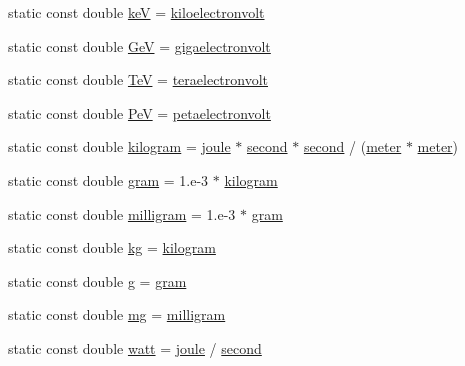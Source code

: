 \begin{DoxyCompactItemize}
\item 
static const double \hyperlink{namespacedd4hep_a2b928c9b9d50fa8a9d3f9840f3a5f258}{keV} = \hyperlink{namespacedd4hep_a05014d49c7c5438820adf620633249e7}{kiloelectronvolt}
\item 
static const double \hyperlink{namespacedd4hep_a3b49780cbe455fda1f6b8a58ff555ae5}{GeV} = \hyperlink{namespacedd4hep_ac36e148fcf16a0ffd9061c13ba225659}{gigaelectronvolt}
\item 
static const double \hyperlink{namespacedd4hep_a7c925bf28d6b294f8f120a69deb6fe02}{TeV} = \hyperlink{namespacedd4hep_ac482cce1ba221816734b1a3384f958d9}{teraelectronvolt}
\item 
static const double \hyperlink{namespacedd4hep_ae90286dc351bfa44df11c5ebf9dbdbe9}{PeV} = \hyperlink{namespacedd4hep_a096cb423758a909c122182a3eed457d1}{petaelectronvolt}
\item 
static const double \hyperlink{namespacedd4hep_a94c5d58440a5bf3d43b1edaa51ae5294}{kilogram} = \hyperlink{namespacedd4hep_a8cdc11c61e5f953baede59569544a324}{joule} $\ast$ \hyperlink{namespacedd4hep_ac03364576705a245265d8ed6ea26b871}{second} $\ast$ \hyperlink{namespacedd4hep_ac03364576705a245265d8ed6ea26b871}{second} / (\hyperlink{namespacedd4hep_a46f5cf0231796af4296a307a58812b06}{meter} $\ast$ \hyperlink{namespacedd4hep_a46f5cf0231796af4296a307a58812b06}{meter})
\item 
static const double \hyperlink{namespacedd4hep_ab7942148388bbfa1f47578732153f293}{gram} = 1.e-\/3 $\ast$ \hyperlink{namespacedd4hep_a94c5d58440a5bf3d43b1edaa51ae5294}{kilogram}
\item 
static const double \hyperlink{namespacedd4hep_ad2ffff3db78948c1ad083f3f41b26acb}{milligram} = 1.e-\/3 $\ast$ \hyperlink{namespacedd4hep_ab7942148388bbfa1f47578732153f293}{gram}
\item 
static const double \hyperlink{namespacedd4hep_a14dce8e79bc3ccbc37eaa636bf0f2329}{kg} = \hyperlink{namespacedd4hep_a94c5d58440a5bf3d43b1edaa51ae5294}{kilogram}
\item 
static const double \hyperlink{namespacedd4hep_a70d02ec06109b52625ae28861ff25d56}{g} = \hyperlink{namespacedd4hep_ab7942148388bbfa1f47578732153f293}{gram}
\item 
static const double \hyperlink{namespacedd4hep_a16e0deb2b676a8d02ab7cf5cf7a8237b}{mg} = \hyperlink{namespacedd4hep_ad2ffff3db78948c1ad083f3f41b26acb}{milligram}
\item 
static const double \hyperlink{namespacedd4hep_ac7c4e7152ccb61b9950932bb06c7c4cd}{watt} = \hyperlink{namespacedd4hep_a8cdc11c61e5f953baede59569544a324}{joule} / \hyperlink{namespacedd4hep_ac03364576705a245265d8ed6ea26b871}{second}

\end{DoxyCompactItemize}
